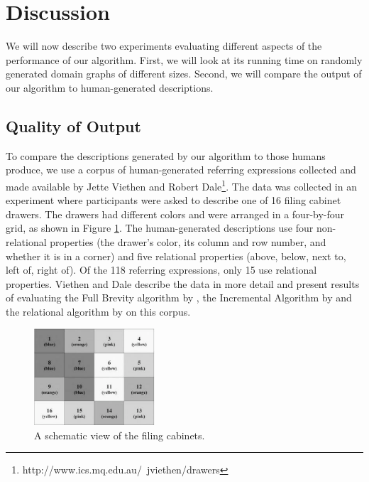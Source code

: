 \section{Discussion} \label{sec:discussion}




We will now describe two experiments evaluating different aspects of
the performance of our algorithm. First, we will look at its running
time on randomly generated domain graphs of different sizes. Second,
we will compare the output of our algorithm to human-generated
descriptions.



\subsection{Quality of Output}

To compare the descriptions generated by our algorithm to
those humans produce, we use a corpus of
human-generated referring expressions collected and made available by
Jette Viethen and Robert
Dale\footnote{http://www.ics.mq.edu.au/~jviethen/drawers}.  The data
was collected in an experiment where participants were asked to
describe one of 16 filing cabinet drawers. The drawers had different
colors and were arranged in a four-by-four grid, as shown in Figure
\ref{fig:drawers}. The human-generated descriptions use four
non-relational properties (the drawer's \textsf{color}, its \textsf{column} and
\textsf{row} number, and whether it is in a \textsf{corner}) and five
relational properties (\textsf{above, below, next to, left of, right
of}). Of the 118 referring expressions, only 15 use relational properties.
Viethen and Dale 
describe the data in more detail and present results of evaluating the
Full Brevity algorithm by \cite{}, the Incremental Algorithm by
\cite{} and the relational algorithm by \cite{} on this corpus.

\begin{figure}
\includegraphics[width=0.4\textwidth]{drawers}
\caption{A schematic view of the filing cabinets.}\label{fig:drawers}
\end{figure}


